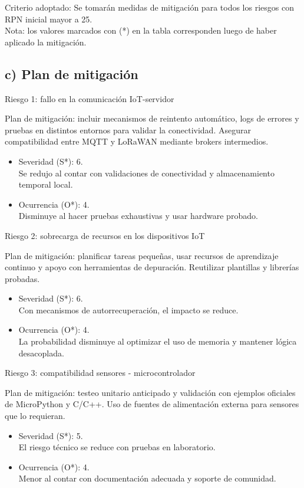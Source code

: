 \documentclass[
11pt, %
]{charter}
\begin{document}
Criterio adoptado: Se tomarán medidas de mitigación para todos los riesgos con RPN inicial mayor a 25. \\
Nota: los valores marcados con (*) en la tabla corresponden luego de haber aplicado la mitigación.


\subsection*{c) Plan de mitigación}

Riesgo 1: fallo en la comunicación IoT-servidor

Plan de mitigación: incluir mecanismos de reintento automático, logs de errores y pruebas en distintos entornos para validar la conectividad. Asegurar compatibilidad entre MQTT y LoRaWAN mediante brokers intermedios.

\begin{itemize}
	\item Severidad (S*): 6.\\ Se redujo al contar con validaciones de conectividad y almacenamiento temporal local.
	\item Ocurrencia (O*): 4.\\ Disminuye al hacer pruebas exhaustivas y usar hardware probado.
\end{itemize}

Riesgo 2: sobrecarga de recursos en los dispositivos IoT

Plan de mitigación: planificar tareas pequeñas, usar recursos de aprendizaje continuo y apoyo con herramientas de depuración. Reutilizar plantillas y librerías probadas.

\begin{itemize}
	\item Severidad (S*): 6.\\
	Con mecanismos de autorrecuperación, el impacto se reduce.
	\item Ocurrencia (O*): 4.\\
	La probabilidad disminuye al optimizar el uso de memoria y mantener lógica desacoplada.
\end{itemize}

Riesgo 3: compatibilidad sensores - microcontrolador

Plan de mitigación: testeo unitario anticipado y validación con ejemplos oficiales de MicroPython y C/C++. Uso de fuentes de alimentación externa para sensores que lo requieran.

\begin{itemize}
	\item Severidad (S*): 5.\\ El riesgo técnico se reduce con pruebas en laboratorio.
	\item Ocurrencia (O*): 4.\\ Menor al contar con documentación adecuada y soporte de comunidad.
\end{itemize}
\end{document}
